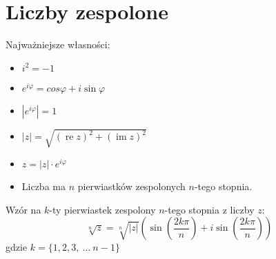 \section*{Liczby zespolone}

Najważniejsze własności:

\begin{itemize}
    \item $i^2 = -1$
    \item $e^{i\varphi} = cos{\varphi} + i\sin{\varphi}$
    \item $|e^{i\varphi}| = 1$
    \item $|z| = \sqrt{(\operatorname{re}{z})^2 +
    (\operatorname{im}{z})^2}$
    \item $z = |z|\cdot e^{i\varphi}$
    \item Liczba ma $n$ pierwiastków zespolonych $n$-tego stopnia.
\end{itemize}
Wzór na $k$-ty pierwiastek zespolony $n$-tego stopnia z liczby $z$:
\begin{equation*}
    \sqrt[n]{z} = \sqrt[n]{|z|}
    \left(
    \sin{\left(\frac{2k\pi}{n}\right)}
    + i\sin{\left(\frac{2k\pi}{n}\right)}
    \right)
\end{equation*}
gdzie
$k = \{1, 2, 3, \ \hdots\ n - 1\}$